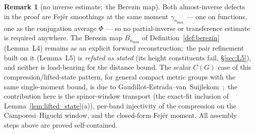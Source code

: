 \documentclass[11pt,a4paper]{article}
\theoremstyle{plain}
\theoremstyle{definition}
\newtheorem{remark}[theorem]{Remark}
\newcommand{\nmax}{n_{\max}}
\begin{document}
\begin{remark}[no inverse estimate;\ the Berezin map]
\label{rem:no_inverse}
Both almost-inverse defects in the proof are Fej\'er smoothings at
the same moment $\gamma_{\nmax}$ --- one on functions, one as the
conjugation average $\Phi$ --- so no partial-inverse or transference
estimate is required anywhere. The Berezin map
$B_{\nmax}$ of Definition~\ref{def:berezin} (Lemma~L4) remains as an
explicit forward reconstruction;\ the pair refinement built on it
(Lemma~L5) is \emph{refuted as stated} (its height constituents fail,
\S\ref{sec:L5}), and neither is load-bearing for the distance bound. The scalar $C(G)$ case of this
compression/lifted-state pattern, for general compact metric groups
with the same single-moment bound, is due to
Gaudillot-Estrada--van~Suijlekom~\cite{gaudillot_vs2025};\ the
contribution here is the spinor-window transport (the exact-fit
inclusion of Lemma~\ref{lem:lifted_state}(a)), per-band
injectivity of the compression on the Camporesi--Higuchi window, and the
closed-form Fej\'er moment. All
assembly steps above are proved self-contained.
\end{remark}
\end{document}
